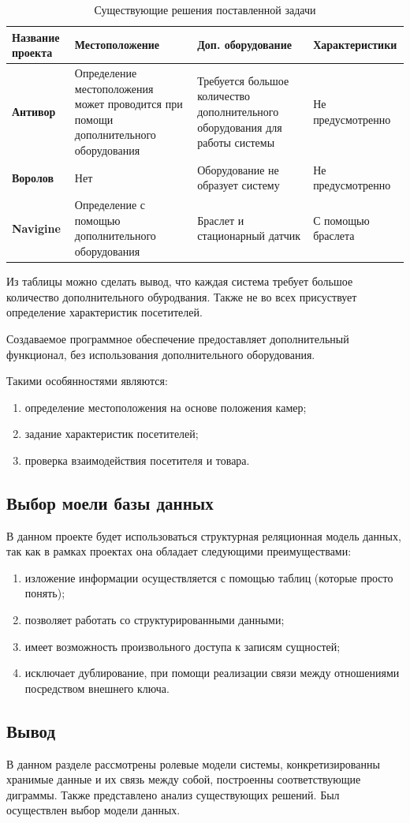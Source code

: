 \begin{table}[ht!]
	\centering
	\caption{Существующие решения поставленной задачи}
	\label{decisions}
	\begin{tabular}{|p{2.6cm}|p{5cm}|p{4cm}|p{4cm}|}
			\hline
			\textbf{Название проекта} & \textbf{Местоположение} & \textbf{Доп. оборудование} & \textbf{Характеристики}\\
			\hline
			\textbf{Антивор \cite{Antivor}} & Определение местоположения может проводится при помощи дополнительного оборудования 
			& Требуется большое количество дополнительного оборудования для работы системы
			 & Не предусмотренно\\
			\hline

			\textbf{Воролов \cite{VOROLOV}} & Нет 
			& Оборудование не образует систему
			 & Не предусмотренно\\
			\hline

			\textbf{Navigine \cite{Navigine}} & Определение с помощью дополнительного оборудования 
			& Браслет и стационарный датчик
			 & С помощью браслета\\
			\hline
	\end{tabular}
\end{table}


Из таблицы можно сделать вывод, что каждая система требует большое количество дополнительного обуродвания.
Также не во всех присуствует определение характеристик посетителей.

Создаваемое программное обеспечение предоставляет дополнительный функционал, без использования дополнительного оборудования.

Такими особянностями являются:

\begin{enumerate}[label=\arabic*.]
	\item определение местоположения на основе положения камер;
	\item задание характеристик посетителей;
	\item проверка взаимодействия посетителя и товара.
\end{enumerate}

\subsection{Выбор моели базы данных}

В данном проекте будет использоваться структурная реляционная модель данных, так как в рамках проектах
она обладает следующими преимуществами:


\begin{enumerate}[label=\arabic*.]
	\item изложение информации осуществляется с помощью таблиц (которые просто понять);
	\item позволяет работать со структурированными данными;
	\item имеет возможность произвольного доступа к записям сущностей;
	\item исключает дублирование, при помощи реализации связи между отношениями посредством внешнего ключа.
\end{enumerate}

\subsection*{Вывод}

В данном разделе рассмотрены ролевые модели системы, конкретизированны хранимые данные и их
связь между собой, построенны соответствующие диграммы. Также представлено анализ существующих решений.
Был осуществлен выбор модели данных.
